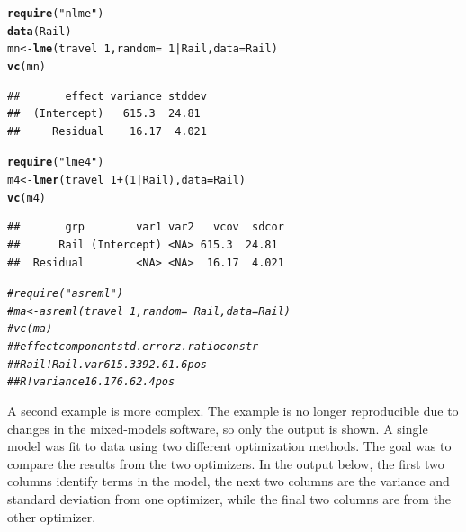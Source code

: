 \documentclass[12pt]{article}\usepackage[]{graphicx}\usepackage[]{color}
\makeatletter
\newcommand{\hlnum}[1]{\textcolor[rgb]{0.686,0.059,0.569}{#1}}%
\newcommand{\hlstr}[1]{\textcolor[rgb]{0.192,0.494,0.8}{#1}}%
\newcommand{\hlcom}[1]{\textcolor[rgb]{0.678,0.584,0.686}{\textit{#1}}}%
\newcommand{\hlopt}[1]{\textcolor[rgb]{0,0,0}{#1}}%
\newcommand{\hlstd}[1]{\textcolor[rgb]{0.345,0.345,0.345}{#1}}%
\newcommand{\hlkwb}[1]{\textcolor[rgb]{0.69,0.353,0.396}{#1}}%
\newcommand{\hlkwc}[1]{\textcolor[rgb]{0.333,0.667,0.333}{#1}}%
\newcommand{\hlkwd}[1]{\textcolor[rgb]{0.737,0.353,0.396}{\textbf{#1}}}%
\newenvironment{kframe}{%
 \def\at@end@of@kframe{}%
 \ifinner\ifhmode%
  \def\at@end@of@kframe{\end{minipage}}%
  \begin{minipage}{\columnwidth}%
 \fi\fi%
 \def\FrameCommand##1{\hskip\@totalleftmargin \hskip-\fboxsep
 \colorbox{shadecolor}{##1}\hskip-\fboxsep
     \hskip-\linewidth \hskip-\@totalleftmargin \hskip\columnwidth}%
 \MakeFramed {\advance\hsize-\width
   \@totalleftmargin\z@ \linewidth\hsize
   \@setminipage}}%
 {\par\unskip\endMakeFramed%
 \at@end@of@kframe}
\newenvironment{knitrout}{}{} %
\makeatother
\begin{document}
\begin{knitrout}
\color{fgcolor}\begin{kframe}
\begin{alltt}
\hlkwd{require}\hlstd{(}\hlstr{"nlme"}\hlstd{)}
\hlkwd{data}\hlstd{(Rail)}
\hlstd{mn} \hlkwb{<-} \hlkwd{lme}\hlstd{(travel}\hlopt{~}\hlnum{1}\hlstd{,} \hlkwc{random}\hlstd{=}\hlopt{~}\hlnum{1}\hlopt{|}\hlstd{Rail,} \hlkwc{data}\hlstd{=Rail)}
\hlkwd{vc}\hlstd{(mn)}
\end{alltt}
\begin{verbatim}
##       effect variance stddev
##  (Intercept)   615.3  24.81 
##     Residual    16.17  4.021
\end{verbatim}
\begin{alltt}
\hlkwd{require}\hlstd{(}\hlstr{"lme4"}\hlstd{)}
\hlstd{m4} \hlkwb{<-} \hlkwd{lmer}\hlstd{(travel}\hlopt{~}\hlnum{1} \hlopt{+} \hlstd{(}\hlnum{1}\hlopt{|}\hlstd{Rail),} \hlkwc{data}\hlstd{=Rail)}
\hlkwd{vc}\hlstd{(m4)}
\end{alltt}
\begin{verbatim}
##       grp        var1 var2   vcov  sdcor
##      Rail (Intercept) <NA> 615.3  24.81 
##  Residual        <NA> <NA>  16.17  4.021
\end{verbatim}
\begin{alltt}
\hlcom{#require("asreml")}
\hlcom{#ma <- asreml(travel~1, random=~Rail, data=Rail)}
\hlcom{#vc(ma)}
\hlcom{##         effect component std.error z.ratio constr}
\hlcom{##  Rail!Rail.var    615.3      392.6     1.6    pos}
\hlcom{##     R!variance     16.17       6.6     2.4    pos}
\end{alltt}
\end{kframe}
\end{knitrout}

A second example is more complex.  The example
is no longer reproducible due to changes in the mixed-models
software, so only the output is shown.  A single model was fit to
data using two different optimization methods.  The goal was to
compare the results from the two optimizers.  In the output below,
the first two columns identify terms in the model, the next two
columns are the variance and standard deviation from one optimizer,
while the final two columns are from the other optimizer.
\end{document}
